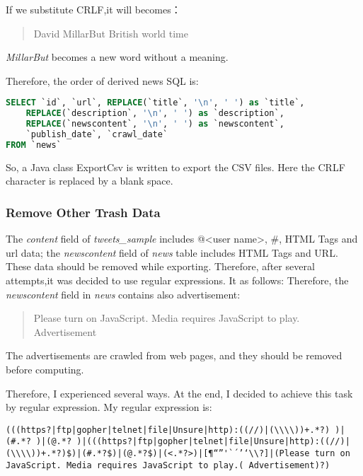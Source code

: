 If we substitute CRLF,it will becomes：

\begin{quote}
	David MillarBut British world time
\end{quote}

\textit{MillarBut} becomes a new word without a meaning. 

Therefore, the order of derived news SQL is: 

\begin{lstlisting}[language=SQL]
SELECT `id`, `url`, REPLACE(`title`, '\n', ' ') as `title`,
	REPLACE(`description`, '\n', ' ') as `description`, 
	REPLACE(`newscontent`, '\n', ' ') as `newscontent`, 
	`publish_date`, `crawl_date` 
FROM `news`
\end{lstlisting}

So, a Java class ExportCsv is written to export the CSV files. Here the CRLF character is replaced by a blank space.

\subsubsection{Remove Other Trash Data}
The \textit{content} field of \textit{tweets\_sample} includes @<user name>, \#<group name>, HTML Tags and url data; the \textit{newscontent} field of \textit{news} table includes HTML Tags and URL. These data should be removed while exporting.
Therefore, after several attempts,it was decided to use regular expressions. It as follows:
Therefore, the \textit{newscontent} field in \textit{news} contains also advertisement: 

\begin{quote}
Please turn on JavaScript. Media requires JavaScript to play. 
Advertisement
\end{quote}

The advertisements are crawled from web pages, and they should be removed before computing.

Therefore, I experienced several ways. At the end, I decided to achieve this task by regular expression. My regular expression is: 

\begin{lstlisting}[language=Rexx]
(((https?|ftp|gopher|telnet|file|Unsure|http):((//)|(\\\\))+.*?) )|(#.*? )|(@.*? )|(((https?|ftp|gopher|telnet|file|Unsure|http):((//)|(\\\\))+.*?)$)|(#.*?$)|(@.*?$)|(<.*?>)|[¶“”'`´’‘\\?]|(Please turn on JavaScript. Media requires JavaScript to play.( Advertisement)?)
\end{lstlisting}

